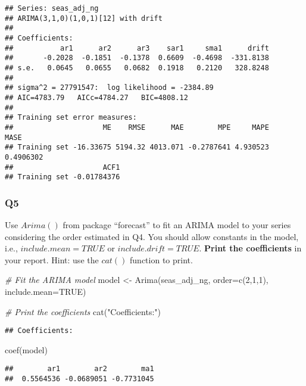 \documentclass[
]{article}
\newenvironment{Shaded}{\begin{snugshade}}{\end{snugshade}}
\newcommand{\AttributeTok}[1]{\textcolor[rgb]{0.77,0.63,0.00}{#1}}
\newcommand{\CommentTok}[1]{\textcolor[rgb]{0.56,0.35,0.01}{\textit{#1}}}
\newcommand{\ConstantTok}[1]{\textcolor[rgb]{0.00,0.00,0.00}{#1}}
\newcommand{\DecValTok}[1]{\textcolor[rgb]{0.00,0.00,0.81}{#1}}
\newcommand{\FunctionTok}[1]{\textcolor[rgb]{0.00,0.00,0.00}{#1}}
\newcommand{\NormalTok}[1]{#1}
\newcommand{\OtherTok}[1]{\textcolor[rgb]{0.56,0.35,0.01}{#1}}
\newcommand{\StringTok}[1]{\textcolor[rgb]{0.31,0.60,0.02}{#1}}
\begin{document}
\begin{verbatim}
## Series: seas_adj_ng 
## ARIMA(3,1,0)(1,0,1)[12] with drift 
## 
## Coefficients:
##           ar1      ar2      ar3    sar1     sma1      drift
##       -0.2028  -0.1851  -0.1378  0.6609  -0.4698  -331.8138
## s.e.   0.0645   0.0655   0.0682  0.1918   0.2120   328.8248
## 
## sigma^2 = 27791547:  log likelihood = -2384.89
## AIC=4783.79   AICc=4784.27   BIC=4808.12
## 
## Training set error measures:
##                     ME    RMSE      MAE        MPE     MAPE      MASE
## Training set -16.33675 5194.32 4013.071 -0.2787641 4.930523 0.4906302
##                     ACF1
## Training set -0.01784376
\end{verbatim}

\hypertarget{q5}{%
\subsubsection{Q5}\label{q5}}

Use \(Arima()\) from package ``forecast'' to fit an ARIMA model to your
series considering the order estimated in Q4. You should allow constants
in the model, i.e., \(include.mean = TRUE\) or \(include.drift=TRUE\).
\textbf{Print the coefficients} in your report. Hint: use the \(cat()\)
function to print.

\begin{Shaded}
\begin{Highlighting}[]
\CommentTok{\# Fit the ARIMA model}
\NormalTok{model }\OtherTok{\textless{}{-}} \FunctionTok{Arima}\NormalTok{(seas\_adj\_ng, }\AttributeTok{order=}\FunctionTok{c}\NormalTok{(}\DecValTok{2}\NormalTok{,}\DecValTok{1}\NormalTok{,}\DecValTok{1}\NormalTok{), }\AttributeTok{include.mean=}\ConstantTok{TRUE}\NormalTok{)}

\CommentTok{\# Print the coefficients}
\FunctionTok{cat}\NormalTok{(}\StringTok{"Coefficients:"}\NormalTok{)}
\end{Highlighting}
\end{Shaded}

\begin{verbatim}
## Coefficients:
\end{verbatim}

\begin{Shaded}
\begin{Highlighting}[]
\FunctionTok{coef}\NormalTok{(model)}
\end{Highlighting}
\end{Shaded}

\begin{verbatim}
##        ar1        ar2        ma1 
##  0.5564536 -0.0689051 -0.7731045
\end{verbatim}
\end{document}
